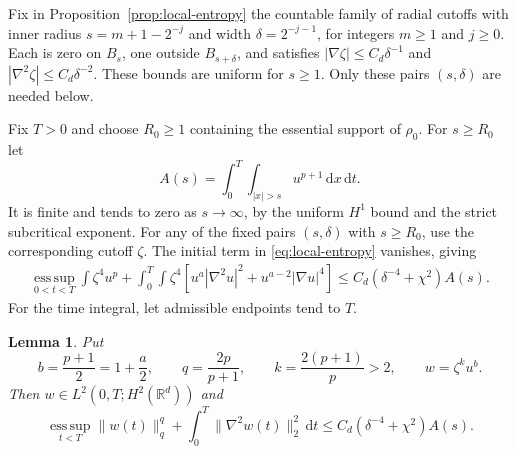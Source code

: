 \documentclass[11pt]{article}
\numberwithin{equation}{section}
\newtheorem{lemma}[theorem]{Lemma}
\theoremstyle{definition}
\theoremstyle{remark}
\newcommand{\R}{\mathbb R}
\newcommand{\dd}{\,\mathrm d}
\newcommand{\esssup}{\operatorname*{ess\,sup}}
\newcommand{\norm}[1]{\lVert #1\rVert}
\begin{document}
Fix in Proposition~\ref{prop:local-entropy} the countable family of radial
cutoffs with inner radius $s=m+1-2^{-j}$ and width $\delta=2^{-j-1}$,
for integers $m\ge1$ and $j\ge0$. Each is zero on $B_s$, one outside
$B_{s+\delta}$, and satisfies $|\nabla\zeta|\le C_d\delta^{-1}$ and
$|\nabla^2\zeta|\le C_d\delta^{-2}$. These bounds are uniform for $s\ge1$.
Only these pairs $(s,\delta)$ are needed below.

Fix $T>0$ and choose $R_0\ge1$ containing the essential support of
$\rho_0$. For $s\ge R_0$ let
\begin{equation}\label{eq:tail}
 A(s)=\int_0^T\!\int_{|x|>s}u^{p+1}\dd x\dd t.
\end{equation}
It is finite and tends to zero as $s\to\infty$, by the uniform $H^1$
bound and the strict subcritical exponent. For any of the fixed pairs
$(s,\delta)$ with $s\ge R_0$, use the corresponding cutoff $\zeta$.
The initial term in \eqref{eq:local-entropy} vanishes, giving
\begin{align}\label{eq:tail-energy}
 \esssup_{0<t<T}\int\zeta^4u^p
 +\int_0^T\!\int\zeta^4
       [u^a|\nabla^2u|^2+u^{a-2}|\nabla u|^4]
 \le C_d(\delta^{-4}+\chi^2)A(s).
\end{align}
For the time integral, let admissible endpoints tend to $T$.

\begin{lemma}\label{lem:power-chain}
Put
\begin{equation}\label{eq:power-choices}
 b=\frac{p+1}{2}=1+\frac a2,\qquad
 q=\frac{2p}{p+1},\qquad k=\frac{2(p+1)}p>2,\qquad
 w=\zeta^k u^b.
\end{equation}
Then $w\in L^2(0,T;H^2(\R^d))$ and
\begin{equation}\label{eq:w-bound}
 \esssup_{t<T}\norm{w(t)}_q^q
             +\int_0^T\norm{\nabla^2w(t)}_2^2\dd t
        \le C_d(\delta^{-4}+\chi^2)A(s).
\end{equation}
\end{lemma}
\end{document}
